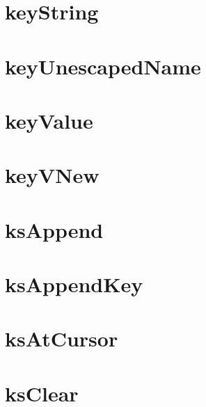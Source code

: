 \let\mypdfximage\pdfximage\def\pdfximage{\immediate\mypdfximage}\documentclass[twoside]{book}
\newcommand{\+}{\discretionary{\mbox{\scriptsize$\hookleftarrow$}}{}{}}
\begin{document}
\chapter{key\+String}
\label{doc_contrib_api_reviews_core_keyString_md}

\chapter{key\+Unescaped\+Name}
\label{doc_contrib_api_reviews_core_keyUnescapedName_md}

\chapter{key\+Value}
\label{doc_contrib_api_reviews_core_keyValue_md}

\chapter{key\+VNew}
\label{doc_contrib_api_reviews_core_keyVNew_md}

\chapter{ks\+Append}
\label{doc_contrib_api_reviews_core_ksAppend_md}

\chapter{ks\+Append\+Key}
\label{doc_contrib_api_reviews_core_ksAppendKey_md}

\chapter{ks\+At\+Cursor}
\label{doc_contrib_api_reviews_core_ksAtCursor_md}

\chapter{ks\+Clear}
\label{doc_contrib_api_reviews_core_ksClear_md}

\end{document}
